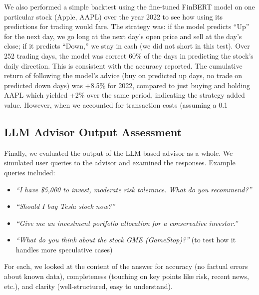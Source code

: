 \documentclass{scrartcl}
\begin{document}
We also performed a simple backtest using the fine-tuned FinBERT model on one particular stock (Apple, AAPL) over the year 2022 to see how using its predictions for trading would fare. The strategy was: if the model predicts “Up” for the next day, we go long at the next day’s open price and sell at the day’s close; if it predicts “Down,” we stay in cash (we did not short in this test). Over 252 trading days, the model was correct 60\% of the days in predicting the stock’s daily direction. This is consistent with the accuracy reported. The cumulative return of following the model’s advice (buy on predicted up days, no trade on predicted down days) was +8.5\% for 2022, compared to just buying and holding AAPL which yielded +2\% over the same period, indicating the strategy added value. However, when we accounted for transaction costs (assuming a 0.1%

\subsection{LLM Advisor Output Assessment}
Finally, we evaluated the output of the LLM-based advisor as a whole. We simulated user queries to the advisor and examined the responses. Example queries included:
\begin{itemize}
    \item \textit{“I have \$5,000 to invest, moderate risk tolerance. What do you recommend?”}
    \item \textit{“Should I buy Tesla stock now?”}
    \item \textit{“Give me an investment portfolio allocation for a conservative investor.”}
    \item \textit{“What do you think about the stock GME (GameStop)?”} (to test how it handles more speculative cases)
\end{itemize}

For each, we looked at the content of the answer for accuracy (no factual errors about known data), completeness (touching on key points like risk, recent news, etc.), and clarity (well-structured, easy to understand).
\end{document}
